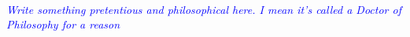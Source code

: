 \thispagestyle{empty}

~\vspace{8cm}

\begin{center}
	\textit{\textcolor{blue}{Write something pretentious and philosophical here. I mean it's called a Doctor of Philosophy for a reason}}
\end{center}


\clearpage
